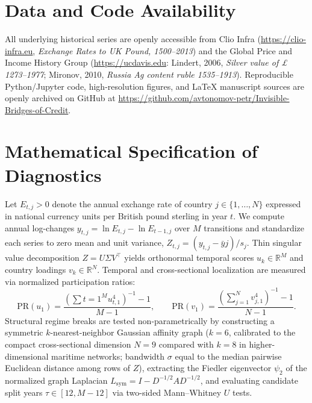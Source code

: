 \documentclass[11pt,a4paper]{article}
\begin{document}
\section*{Data and Code Availability}
All underlying historical series are openly accessible from Clio Infra (\url{https://clio-infra.eu}, \emph{Exchange Rates to UK Pound, 1500--2013}) and the Global Price and Income History Group (\url{https://ucdavis.edu}: Lindert, 2006, \emph{Silver value of \pounds{} 1273--1977}; Mironov, 2010, \emph{Russia Ag content ruble 1535--1913}). Reproducible Python/Jupyter code, high-resolution figures, and LaTeX manuscript sources are openly archived on GitHub at \url{https://github.com/avtonomov-petr/Invisible-Bridges-of-Credit}.

\appendix
\section{Mathematical Specification of Diagnostics}
Let $E_{t,j} > 0$ denote the annual exchange rate of country $j \in \{1,\dots,N\}$ expressed in national currency units per British pound sterling in year $t$. We compute annual log-changes $y_{t,j} = \ln E_{t,j} - \ln E_{t-1,j}$ over $M$ transitions and standardize each series to zero mean and unit variance, $Z_{t,j} = (y_{t,j} - \bar{y}j)/s_j$. Thin singular value decomposition $Z = U \Sigma V^\top$ yields orthonormal temporal scores $u_k \in \mathbb{R}^M$ and country loadings $v_k \in \mathbb{R}^N$. Temporal and cross-sectional localization are measured via normalized participation ratios:
\begin{equation}
\mathrm{PR}(u_1) = \frac{\left(\sum{t=1}^M u_{t,1}^4\right)^{-1} - 1}{M - 1}, \qquad
\mathrm{PR}(v_1) = \frac{\left(\sum_{j=1}^N v_{j,1}^4\right)^{-1} - 1}{N - 1}.
\end{equation}
Structural regime breaks are tested non-parametrically by constructing a symmetric $k$-nearest-neighbor Gaussian affinity graph ($k=6$, calibrated to the compact cross-sectional dimension $N=9$ compared with $k=8$ in higher-dimensional maritime networks; bandwidth $\sigma$ equal to the median pairwise Euclidean distance among rows of $Z$), extracting the Fiedler eigenvector $\psi_2$ of the normalized graph Laplacian $L_{\mathrm{sym}} = I - D^{-1/2} A D^{-1/2}$, and evaluating candidate split years $\tau \in [12, M-12]$ via two-sided Mann--Whitney $U$ tests.
\end{document}
